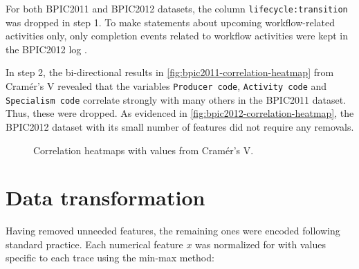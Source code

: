For both BPIC2011 and BPIC2012 datasets, the column \texttt{lifecycle:transition} was dropped in step 1. To make statements about upcoming workflow-related activities only, only completion events related to workflow activities were kept in the BPIC2012 log \cite{evermann2016}.

In step 2, the bi-directional results in \autoref{fig:bpic2011-correlation-heatmap} from Cramér's V revealed that the variables \texttt{Producer code}, \texttt{Activity code} and \texttt{Specialism code} correlate strongly with many others in the BPIC2011 dataset. Thus, these were dropped. As evidenced in \autoref{fig:bpic2012-correlation-heatmap}, the BPIC2012 dataset with its small number of features did not require any removals.

\begin{figure}
\centering
{}
\qquad
{}
\caption{Correlation heatmaps with values from Cramér's V.}
\end{figure}

\section{Data transformation}
Having removed unneeded features, the remaining ones were encoded following standard practice. Each numerical feature $x$ was normalized for with values specific to each trace using the min-max method:

